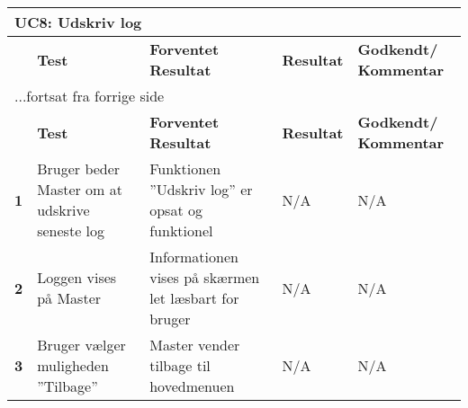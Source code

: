 
\begin{center}
\begin{longtable}{|p{}|p{}|p{}|p{}|p{}|} %
\hline
\multicolumn{5}{|l|}{\textbf{UC8: Udskriv log}} \\ \hline
\multicolumn{1}{|c|}{} &
\textbf{Test} &
\textbf{Forventet \newline Resultat} &
\textbf{Resultat} &
\textbf{Godkendt/ \newline Kommentar} \\ \hline 
\endfirsthead

\multicolumn{5}{l}{...fortsat fra forrige side} \\ \hline 
\multicolumn{1}{|c|}{} &
\textbf{Test} &
\textbf{Forventet \newline Resultat} &
\textbf{Resultat} &
\textbf{Godkendt/ \newline Kommentar} \\ \hline 
\endhead

\textbf{1}	&Bruger beder Master om at udskrive seneste log
			&Funktionen ''Udskriv log'' er opsat og funktionel
			&N/A
			&N/A \\ \hline 
			
\textbf{2}	&Loggen vises på Master
			&Informationen vises på skærmen let læsbart for bruger
			&N/A
			&N/A \\ \hline 
			
\textbf{3}	&Bruger vælger muligheden ''Tilbage''
			&Master vender tilbage til hovedmenuen
			&N/A
			&N/A \\ \hline 
			
\end{longtable}
	\label{ATUC8} 
\end{center}
